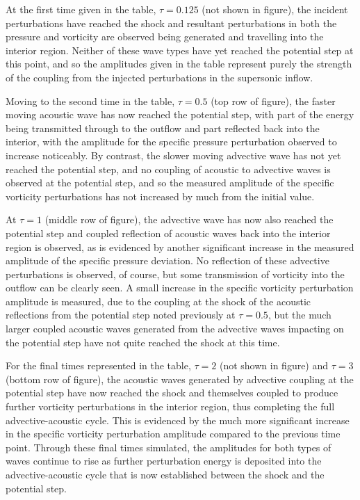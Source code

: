 At the first time given in the table, $\tau=0.125$ (not shown in figure), the incident perturbations have reached the shock and resultant perturbations in both the pressure and vorticity are observed being generated and travelling into the interior region. Neither of these wave types have yet reached the potential step at this point, and so the amplitudes given in the table represent purely the strength of the coupling from the injected perturbations in the supersonic inflow.

Moving to the second time in the table, $\tau=0.5$ (top row of figure), the faster moving acoustic wave has now reached the potential step, with part of the energy being transmitted through to the outflow and part reflected back into the interior, with the amplitude for the specific pressure perturbation observed to increase noticeably. By contrast, the slower moving advective wave has not yet reached the potential step, and no coupling of acoustic to advective waves is observed at the potential step, and so the measured amplitude of the specific vorticity perturbations has not increased by much from the initial value.

At $\tau=1$ (middle row of figure), the advective wave has now also reached the potential step and coupled reflection of acoustic waves back into the interior region is observed, as is evidenced by another significant increase in the measured amplitude of the specific pressure deviation. No reflection of these advective perturbations is observed, of course, but some transmission of vorticity into the outflow can be clearly seen. A small increase in the specific vorticity perturbation amplitude is measured, due to the coupling at the shock of the acoustic reflections from the potential step noted previously at $\tau=0.5$, but the much larger coupled acoustic waves generated from the advective waves impacting on the potential step have not quite reached the shock at this time.

For the final times represented in the table, $\tau=2$ (not shown in figure) and $\tau=3$ (bottom row of figure), the acoustic waves generated by advective coupling at the potential step have now reached the shock and themselves coupled to produce further vorticity perturbations in the interior region, thus completing the full advective-acoustic cycle. This is evidenced by the much more significant increase in the specific vorticity perturbation amplitude compared to the previous time point. Through these final times simulated, the amplitudes for both types of waves continue to rise as further perturbation energy is deposited into the advective-acoustic cycle that is now established between the shock and the potential step.

